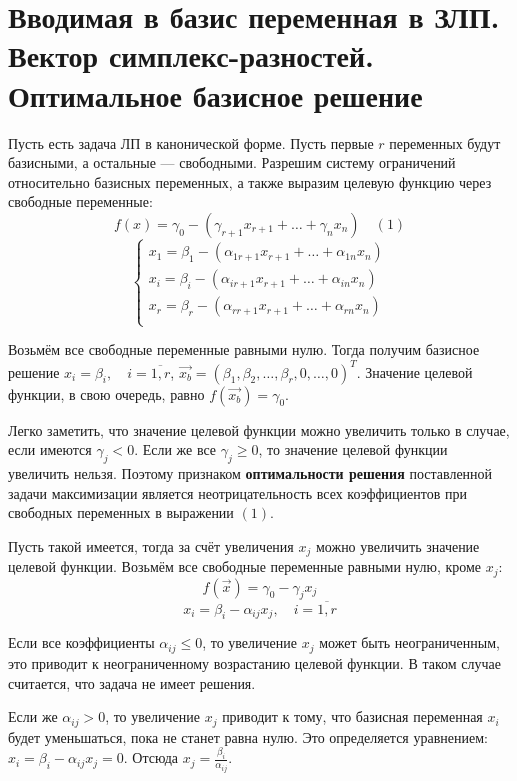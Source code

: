 \documentclass[17pt]{extarticle}
\begin{document}
\section{Вводимая в базис переменная в ЗЛП. Вектор симплекс-разностей. Оптимальное базисное решение}

Пусть есть задача ЛП в канонической форме. Пусть первые \( r \) переменных будут базисными, а остальные — свободными. Разрешим систему ограничений относительно базисных переменных, а также выразим целевую функцию через свободные переменные:
\[
    f(x) = \gamma_0 - (\gamma_{r+1}x_{r+1} + \dots + \gamma_n x_n) \quad (1)
\]
\[
    \begin{cases}
        x_1 = \beta_1 - (\alpha_{1 r+1}x_{r+1} + \dots + \alpha_{1n}x_n) \\
        x_i = \beta_i - (\alpha_{i r+1}x_{r+1} + \dots + \alpha_{in}x_n) \\
        x_r = \beta_r - (\alpha_{r r+1}x_{r+1} + \dots + \alpha_{rn}x_n) \\
    \end{cases}
\]

Возьмём все свободные переменные равными нулю. Тогда получим базисное решение \( x_i = \beta_i, \quad i = \overline{1,r} \), \( \vec{x_b} = (\beta_1, \beta_2, \dots, \beta_r, 0, \dots, 0)^T \). Значение целевой функции, в свою очередь, равно \( f(\vec{x_b}) = \gamma_0 \).

Легко заметить, что значение целевой функции можно увеличить только в случае, если имеются \( \gamma_j < 0 \). Если же все \( \gamma_j \ge 0 \), то значение целевой функции увеличить нельзя. Поэтому признаком \textbf{оптимальности решения} поставленной задачи максимизации является неотрицательность всех коэффициентов при свободных переменных в выражении \( (1) \).

Пусть такой имеется, тогда за счёт увеличения \( x_j \) можно увеличить значение целевой функции. Возьмём все свободные переменные равными нулю, кроме \( x_j \):
\[
    f(\vec{x}) = \gamma_0 - \gamma_j x_j
\]
\[
    x_i = \beta_i - \alpha_{ij} x_j, \quad i = \overline{1,r}
\]

Если все коэффициенты \( \alpha_{ij} \le 0 \), то увеличение \( x_j \) может быть неограниченным, это приводит к неограниченному возрастанию целевой функции. В таком случае считается, что задача не имеет решения.

Если же \( \alpha_{ij} > 0 \), то увеличение \( x_j \) приводит к тому, что базисная переменная \( x_i \) будет уменьшаться, пока не станет равна нулю. Это определяется уравнением: \( x_i = \beta_i - \alpha_{ij} x_j = 0 \). Отсюда \( x_j = \frac{\beta_i}{\alpha_{ij}} \).
\end{document}
